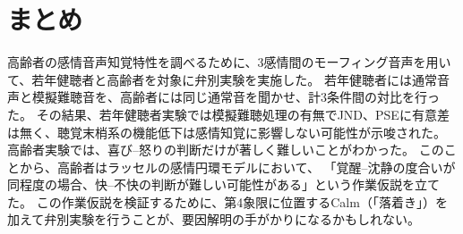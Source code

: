 \section{まとめ}
高齢者の感情音声知覚特性を調べるために、3感情間のモーフィング音声を用いて、若年健聴者と高齢者を対象に弁別実験を実施した。
若年健聴者には通常音声と模擬難聴音を、高齢者には同じ通常音を聞かせ、計3条件間の対比を行った。
その結果、若年健聴者実験では模擬難聴処理の有無でJND、PSEに有意差は無く、聴覚末梢系の機能低下は感情知覚に影響しない可能性が示唆された。
高齢者実験では、喜び--怒りの判断だけが著しく難しいことがわかった。
このことから、高齢者はラッセルの感情円環モデル\cite{russell1980circumplex}において、
「覚醒--沈静の度合いが同程度の場合、快--不快の判断が難しい可能性がある」という作業仮説を立てた。
この作業仮説を検証するために、第4象限に位置するCalm（「落着き」）を加えて弁別実験を行うことが、要因解明の手がかりになるかもしれない。

